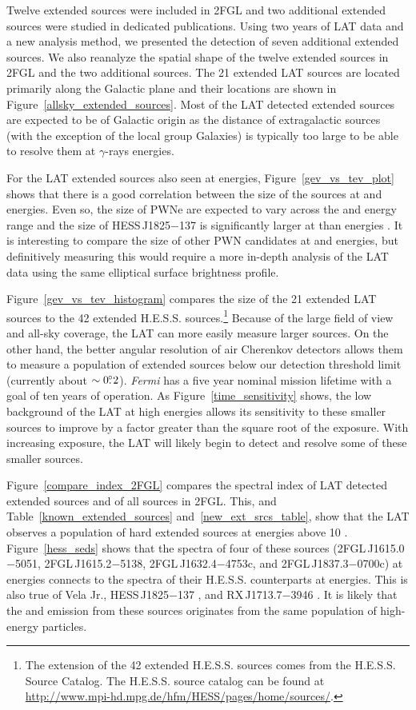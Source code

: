 \documentclass[12pt,preprint]{aastex}
\newcommand{\gev}{\text{GeV}\xspace}
\newcommand{\tev}{\text{TeV}\xspace}
\newcommand{\fermi}{\textit{Fermi}\xspace}
\begin{document}
Twelve extended sources were included in 2FGL and two additional extended
sources were studied in dedicated publications.  Using two years of
LAT data and a new analysis method, we presented the detection of seven
additional extended sources.  We also reanalyze the spatial shape of the
twelve extended sources in 2FGL and the two additional sources.  The 21
extended LAT sources are located primarily along the Galactic plane
and their locations are shown in Figure~\ref{allsky_extended_sources}.
Most of the LAT detected extended sources are expected to be of Galactic
origin as the distance of extragalactic sources (with the exception of
the local group Galaxies) is typically too large to be able to resolve
them at $\gamma$-rays energies.

For the LAT extended sources also seen at \tev energies,
Figure~\ref{gev_vs_tev_plot} shows that there is a good correlation
between the size of the sources at \gev and \tev energies. Even so,
the size of PWNe are expected to vary across the \gev and \tev energy
range and the size of HESS\,J1825$-$137 is significantly larger at
\gev than \tev energies \citep{fermi_hess_j1825}.  It is interesting
to compare the size of other PWN candidates at \gev and \tev energies,
but definitively measuring this would require a more in-depth analysis
of the LAT data using the same elliptical surface brightness profile.

Figure~\ref{gev_vs_tev_histogram} compares the size of the 21 extended
LAT sources to the 42 extended H.E.S.S. sources.\footnote{The 
\tev extension of
the 42 extended H.E.S.S. sources comes from the H.E.S.S. Source
Catalog. The H.E.S.S. source catalog can be found at \url{http://www.mpi-hd.mpg.de/hfm/HESS/pages/home/sources/}.}
Because of the large
field of view and all-sky coverage, the LAT can more easily measure
larger sources.  On the other hand, the 
better
angular resolution of air Cherenkov detectors allows them to measure a
population of extended sources below our detection threshold limit (currently 
about $\sim0\mbox{$.\!\!^\circ$}2$).  \fermi has a five year nominal mission lifetime with
a goal of ten years of operation.  As Figure~\ref{time_sensitivity} shows,
the low background of the LAT at high energies allows its sensitivity 
to
these smaller sources to improve by a factor greater than the square root
of the exposure.  With increasing exposure, the LAT will likely begin to
detect and resolve some of these smaller \tev sources.

Figure~\ref{compare_index_2FGL} compares the spectral index of LAT
detected extended sources and of all sources in 2FGL. This, and
Table~\ref{known_extended_sources} and~\ref{new_ext_srcs_table},
show that the LAT observes a population of hard extended sources
at energies above 10 \gev.  Figure~\ref{hess_seds} shows that
the spectra of four of these sources (2FGL\,J1615.0$-$5051,
2FGL\,J1615.2$-$5138, 2FGL\,J1632.4$-$4753c, and 2FGL\,J1837.3$-$0700c)
at \gev energies connects to the spectra of their H.E.S.S. counterparts
at \tev energies. This is also true of Vela Jr., HESS\,J1825$-$137
\citep{fermi_hess_j1825}, and RX\,J1713.7$-$3946 \citep{rx_j1713_lat}.
It is likely that the \gev and \tev emission from these sources originates
from the same population of high-energy particles.
\end{document}
